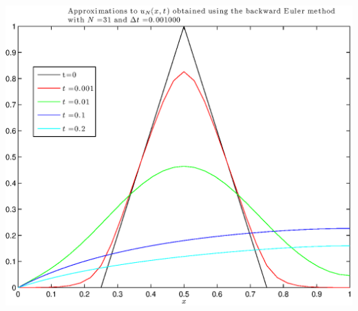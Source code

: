 \begin{solution}
\begin{enumerate}
\begin{center}
\includegraphics[scale=0.75]{hw50f31.eps}
\end{center}

\end{enumerate}
\end{solution}